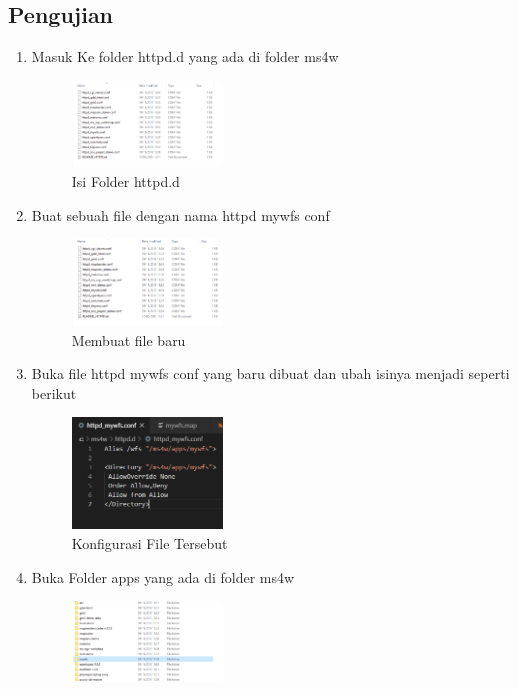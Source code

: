 \subsection{Pengujian}
\begin{enumerate}
  \item Masuk Ke folder httpd.d yang ada di folder ms4w
  \hfill\break
    \begin{figure}[H]
		\includegraphics[width=4cm]{figures/1174095/4/Pengujian1.png}
		\centering
		\caption{Isi Folder httpd.d}
    \end{figure}
  \item Buat sebuah file dengan nama httpd mywfs conf
  \hfill\break
    \begin{figure}[H]
		\includegraphics[width=4cm]{figures/1174095/4/Pengujian2.png}
		\centering
		\caption{Membuat file baru}
    \end{figure}
  \item Buka file httpd mywfs conf yang baru dibuat dan ubah isinya menjadi seperti berikut
  \hfill\break
    \begin{figure}[H]
		\includegraphics[width=4cm]{figures/1174095/4/Pengujian3.png}
		\centering
		\caption{Konfigurasi File Tersebut}
    \end{figure}
  \item Buka Folder apps yang ada di folder ms4w
  \hfill\break
    \begin{figure}[H]
		\includegraphics[width=4cm]{figures/1174095/4/Pengujian4.png}

\end{figure}
\end{enumerate}
